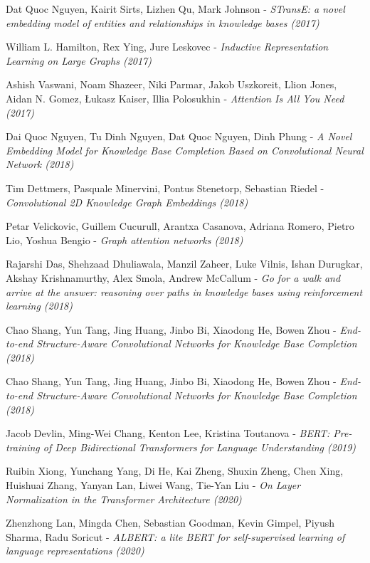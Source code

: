 \documentclass[longabstract, english, mgr]{iithesis}
\theoremstyle{default_theorem_style}\newtheorem{theorem}{Theorem}
\theoremstyle{default_theorem_style}\newtheorem{definition}{Definition}
\begin{document}
\begin{thebibliography}{99}
Dat Quoc Nguyen, Kairit Sirts, Lizhen Qu, Mark Johnson - \textit{STransE: a novel embedding model of entities and
relationships in knowledge bases (2017)}

William L. Hamilton, Rex Ying, Jure Leskovec - \textit{Inductive Representation Learning on Large Graphs (2017)}

Ashish Vaswani, Noam Shazeer, Niki Parmar, Jakob Uszkoreit, Llion Jones, Aidan N. Gomez, Łukasz Kaiser,
Illia Polosukhin - \textit{Attention Is All You Need (2017)}

Dai Quoc Nguyen, Tu Dinh Nguyen, Dat Quoc Nguyen, Dinh Phung - \textit{A Novel Embedding Model for Knowledge Base
Completion Based on Convolutional Neural Network (2018)}

Tim Dettmers, Pasquale Minervini, Pontus Stenetorp, Sebastian Riedel - \textit{Convolutional 2D Knowledge
Graph Embeddings (2018)}

Petar Velickovic, Guillem Cucurull, Arantxa Casanova, Adriana Romero, Pietro Lio, Yoshua Bengio - \textit{Graph
attention networks (2018)}

Rajarshi Das, Shehzaad Dhuliawala, Manzil Zaheer, Luke Vilnis, Ishan Durugkar, Akshay Krishnamurthy, Alex Smola,
Andrew McCallum - \textit{Go for a walk and arrive at the answer: reasoning over paths in knowledge bases using
reinforcement learning (2018)}

Chao Shang, Yun Tang, Jing Huang, Jinbo Bi, Xiaodong He, Bowen Zhou - \textit{
End-to-end Structure-Aware Convolutional Networks for Knowledge Base Completion (2018)}

Chao Shang, Yun Tang, Jing Huang, Jinbo Bi, Xiaodong He, Bowen Zhou - \textit{End-to-end Structure-Aware
Convolutional Networks for Knowledge Base Completion (2018)}

Jacob Devlin, Ming-Wei Chang, Kenton Lee, Kristina Toutanova - \textit{BERT: Pre-training of Deep Bidirectional
Transformers for Language Understanding (2019)}

Ruibin Xiong, Yunchang Yang,  Di He, Kai Zheng, Shuxin Zheng, Chen Xing, Huishuai Zhang, Yanyan Lan,
Liwei Wang, Tie-Yan Liu - \textit{On Layer Normalization in the Transformer Architecture (2020)}

Zhenzhong Lan, Mingda Chen, Sebastian Goodman, Kevin Gimpel, Piyush Sharma, Radu Soricut - \textit{ALBERT: a
lite BERT for self-supervised learning of language representations (2020)}


\end{thebibliography}
\end{document}
